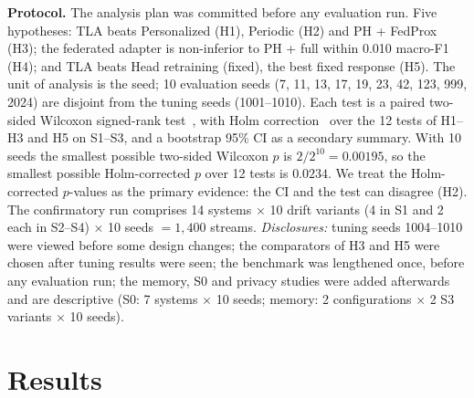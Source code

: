 \documentclass[conference]{IEEEtran}
\newcommand{\fone}{macro-F1}
\newcommand{\tla}{TLA}
\begin{document}
\textbf{Protocol.} The analysis plan was committed before any evaluation run. Five hypotheses: \tla{} beats Personalized (H1), Periodic (H2) and PH + FedProx (H3); the federated adapter is non-inferior to PH + full within 0.010 \fone{} (H4); and \tla{} beats Head retraining (fixed), the best fixed response (H5). The unit of analysis is the seed; 10 evaluation seeds (7, 11, 13, 17, 19, 23, 42, 123, 999, 2024) are disjoint from the tuning seeds (1001--1010). Each test is a paired two-sided Wilcoxon signed-rank test~\cite{wilcoxon1945}, with Holm correction~\cite{holm1979} over the 12 tests of H1--H3 and H5 on S1--S3, and a bootstrap 95\% CI as a secondary summary. With 10 seeds the smallest possible two-sided Wilcoxon $p$ is $2/2^{10}=0.00195$, so the smallest possible Holm-corrected $p$ over 12 tests is $0.0234$. We treat the Holm-corrected $p$-values as the primary evidence: the CI and the test can disagree (H2). The confirmatory run comprises 14 systems $\times$ 10 drift variants (4 in S1 and 2 each in S2--S4) $\times$ 10 seeds $=1{,}400$ streams. \emph{Disclosures:} tuning seeds 1004--1010 were viewed before some design changes; the comparators of H3 and H5 were chosen after tuning results were seen; the benchmark was lengthened once, before any evaluation run; the memory, S0 and privacy studies were added afterwards and are descriptive (S0: 7 systems $\times$ 10 seeds; memory: 2 configurations $\times$ 2 S3 variants $\times$ 10 seeds).

\section{Results}
\end{document}
